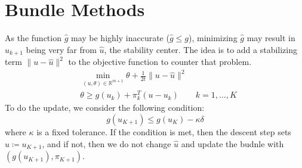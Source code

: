 \documentclass[12pt, openany]{report}
\newcommand{\R}{\mathbb{R}}
\theoremstyle{definition}
\begin{document}
\section{Bundle Methods}
As the function $\hat g$ may be highly inaccurate ($\hat g\le g$), minimizing $\hat g$ may result in $u_{k+1}$ being very far from $\hat u$, the stability center. The idea is to add a stabilizing term $\|u-\hat u\|^2$ to the objective function to counter that problem. 
\begin{equation}
	\begin{aligned}
		&\min_{(u,\theta)\in \R^{m+1}} \theta + \frac{1}{2t}\|u-\hat u\|^2 \\
		& \theta \ge g(u_k) + \pi_k^T (u-u_k)\qquad k=1,\dots,K 
	\end{aligned}
\end{equation}
To do the update, we consider the following condition:
\begin{equation}
	g(u_{K+1}) \le g(u_K) -\kappa \delta 
\end{equation}
where $\kappa$ is a fixed tolerance. If the condition is met, then the descent step sets $\hat u \coloneqq u_{K+1}$, and if not, then we do not change $\hat u$ and update the budnle with $(g(u_{K+1}),\pi_{K+1})$.\\
\end{document}
